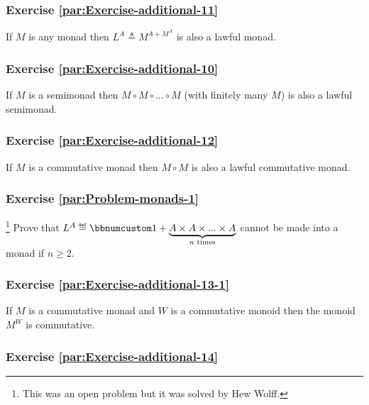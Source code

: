 \subsubsection{Exercise \label{par:Exercise-additional-11}\ref{par:Exercise-additional-11}}

If $M$ is any monad then $L^{A}\triangleq M^{A+M^{A}}$ is also a
lawful monad.

\subsubsection{Exercise \label{par:Exercise-additional-10}\ref{par:Exercise-additional-10}}

If $M$ is a semimonad then $M\circ M\circ...\circ M$ (with finitely
many $M$) is also a lawful semimonad.

\subsubsection{Exercise \label{par:Exercise-additional-12}\ref{par:Exercise-additional-12}}

If $M$ is a commutative monad then $M\circ M$ is also a lawful commutative
monad.

\subsubsection{Exercise \label{par:Problem-monads-1}\ref{par:Problem-monads-1}}

\footnote{This was an open problem but it was solved by Hew Wolff.}
Prove that $L^{A}\triangleq\bbnum 1+\underbrace{A\times A\times...\times A}_{n\text{ times}}$
cannot be made into a monad if $n\ge2$.

\subsubsection{Exercise \label{par:Exercise-additional-13-1}\ref{par:Exercise-additional-13-1}}

If $M$ is a commutative monad and $W$ is a commutative monoid then
the monoid $M^{W}$ is commutative.

\subsubsection{Exercise \label{par:Exercise-additional-14}\ref{par:Exercise-additional-14}}

